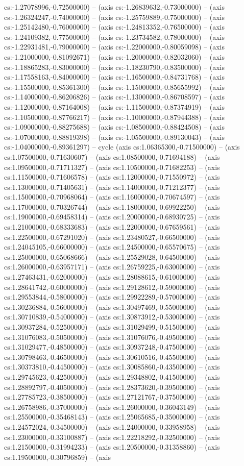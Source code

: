 cs:-1.27078996,-0.72500000) -- (axis cs:-1.26839632,-0.73000000) -- (axis cs:-1.26324247,-0.74000000) -- (axis cs:-1.25759889,-0.75000000) -- (axis cs:-1.25142480,-0.76000000) -- (axis cs:-1.24813352,-0.76500000) -- (axis cs:-1.24109382,-0.77500000) -- (axis cs:-1.23734582,-0.78000000) -- (axis cs:-1.22931481,-0.79000000) -- (axis cs:-1.22000000,-0.80059098) -- (axis cs:-1.21000000,-0.81092671) -- (axis cs:-1.20000000,-0.82032060) -- (axis cs:-1.18865283,-0.83000000) -- (axis cs:-1.18230790,-0.83500000) -- (axis cs:-1.17558163,-0.84000000) -- (axis cs:-1.16500000,-0.84731768) -- (axis cs:-1.15500000,-0.85361300) -- (axis cs:-1.15000000,-0.85655992) -- (axis cs:-1.14000000,-0.86206826) -- (axis cs:-1.13000000,-0.86708597) -- (axis cs:-1.12000000,-0.87164008) -- (axis cs:-1.11500000,-0.87374919) -- (axis cs:-1.10500000,-0.87766217) -- (axis cs:-1.10000000,-0.87944388) -- (axis cs:-1.09000000,-0.88275688) -- (axis cs:-1.08500000,-0.88424508) -- (axis cs:-1.07000000,-0.88819398) -- (axis cs:-1.05500000,-0.89130043) -- (axis cs:-1.04000000,-0.89361297) -- cycle (axis cs:1.06365300,-0.71500000) -- (axis cs:1.07500000,-0.71630607) -- (axis cs:1.08500000,-0.71694188) -- (axis cs:1.09500000,-0.71711327) -- (axis cs:1.10500000,-0.71682253) -- (axis cs:1.11500000,-0.71606578) -- (axis cs:1.12000000,-0.71550972) -- (axis cs:1.13000000,-0.71405631) -- (axis cs:1.14000000,-0.71212377) -- (axis cs:1.15000000,-0.70968064) -- (axis cs:1.16000000,-0.70674597) -- (axis cs:1.17000000,-0.70326744) -- (axis cs:1.18000000,-0.69922250) -- (axis cs:1.19000000,-0.69458314) -- (axis cs:1.20000000,-0.68930725) -- (axis cs:1.21000000,-0.68333683) -- (axis cs:1.22000000,-0.67659561) -- (axis cs:1.22500000,-0.67291020) -- (axis cs:1.23480527,-0.66500000) -- (axis cs:1.24045105,-0.66000000) -- (axis cs:1.24500000,-0.65570675) -- (axis cs:1.25000000,-0.65068666) -- (axis cs:1.25529028,-0.64500000) -- (axis cs:1.26000000,-0.63957171) -- (axis cs:1.26759225,-0.63000000) -- (axis cs:1.27463431,-0.62000000) -- (axis cs:1.28088615,-0.61000000) -- (axis cs:1.28641742,-0.60000000) -- (axis cs:1.29128612,-0.59000000) -- (axis cs:1.29553844,-0.58000000) -- (axis cs:1.29922289,-0.57000000) -- (axis cs:1.30236884,-0.56000000) -- (axis cs:1.30497469,-0.55000000) -- (axis cs:1.30710839,-0.54000000) -- (axis cs:1.30873912,-0.53000000) -- (axis cs:1.30937284,-0.52500000) -- (axis cs:1.31029499,-0.51500000) -- (axis cs:1.31076083,-0.50500000) -- (axis cs:1.31076076,-0.49500000) -- (axis cs:1.31029477,-0.48500000) -- (axis cs:1.30937248,-0.47500000) -- (axis cs:1.30798463,-0.46500000) -- (axis cs:1.30610516,-0.45500000) -- (axis cs:1.30373810,-0.44500000) -- (axis cs:1.30085860,-0.43500000) -- (axis cs:1.29745623,-0.42500000) -- (axis cs:1.29348802,-0.41500000) -- (axis cs:1.28892797,-0.40500000) -- (axis cs:1.28373620,-0.39500000) -- (axis cs:1.27785723,-0.38500000) -- (axis cs:1.27121767,-0.37500000) -- (axis cs:1.26758986,-0.37000000) -- (axis cs:1.26000000,-0.36043149) -- (axis cs:1.25500000,-0.35468143) -- (axis cs:1.25065685,-0.35000000) -- (axis cs:1.24572024,-0.34500000) -- (axis cs:1.24000000,-0.33958958) -- (axis cs:1.23000000,-0.33100887) -- (axis cs:1.22218292,-0.32500000) -- (axis cs:1.21500000,-0.31994233) -- (axis cs:1.20500000,-0.31358860) -- (axis cs:1.19500000,-0.30796859) -- (axis 